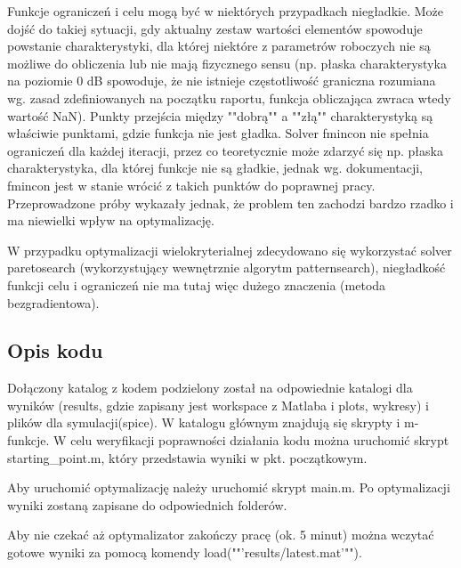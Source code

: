\documentclass{article}
\begin{document}
Funkcje ograniczeń i celu mogą być w niektórych przypadkach niegładkie. Może dojść do takiej sytuacji, gdy aktualny zestaw wartości elementów spowoduje powstanie charakterystyki,
dla której niektóre z parametrów roboczych nie są możliwe do obliczenia lub nie mają fizycznego sensu (np. płaska charakterystyka na poziomie 0 dB spowoduje, że nie istnieje częstotliwość graniczna rozumiana wg. zasad zdefiniowanych
na początku raportu, funkcja obliczająca zwraca wtedy wartość NaN). Punkty przejścia między ""dobrą"" a ""złą"" charakterystyką są właściwie punktami, gdzie funkcja nie jest gładka. Solver fmincon nie spełnia ograniczeń dla każdej iteracji, przez co teoretycznie może zdarzyć się np. płaska charakterystyka, 
dla której funkcje nie są gładkie, jednak wg. dokumentacji, fmincon jest w stanie wrócić z takich punktów do poprawnej pracy. Przeprowadzone próby wykazały jednak, że problem ten zachodzi bardzo rzadko i ma niewielki wpływ na optymalizację.

W przypadku optymalizacji wielokryterialnej zdecydowano się wykorzystać solver paretosearch (wykorzystujący wewnętrznie algorytm patternsearch), niegładkość funkcji celu i ograniczeń nie ma tutaj więc dużego znaczenia (metoda bezgradientowa).
\subsection{Opis kodu}
Dołączony katalog z kodem podzielony został na odpowiednie katalogi dla wyników (results, gdzie zapisany jest workspace z Matlaba i plots, wykresy) i plików dla symulacji(spice).
W katalogu głównym znajdują się skrypty i m-funkcje. W celu weryfikacji poprawności działania kodu można uruchomić skrypt starting\_point.m, który przedstawia wyniki w pkt. początkowym.

Aby uruchomić optymalizację należy uruchomić skrypt main.m. Po optymalizacji wyniki zostaną zapisane do odpowiednich folderów.

Aby nie czekać aż optymalizator zakończy pracę (ok. 5 minut) można wczytać gotowe wyniki za pomocą komendy load(""'results/latest.mat'"").
\end{document}
